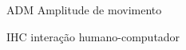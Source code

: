 \begin{siglas}
  \item[ADM] Amplitude de movimento
  \item[IHC] interação humano-computador
\end{siglas}
